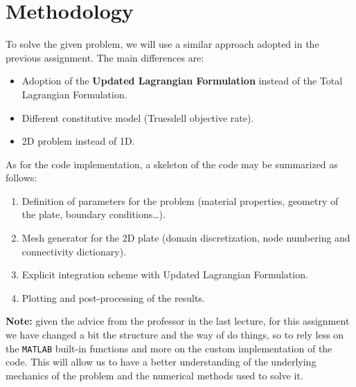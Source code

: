 \section{Methodology}
\label{sec:methodology}

To solve the given problem, we will use a similar approach adopted in the previous assignment.
The main differences are:

\begin{itemize}
    \item Adoption of the \textbf{Updated Lagrangian Formulation} instead of the Total Lagrangian Formulation.
    \item Different constitutive model (Truesdell objective rate).
    \item 2D problem instead of 1D.
\end{itemize}

As for the code implementation, a skeleton of the code may be summarized as follows:

\begin{enumerate}
    \item Definition of parameters for the problem (material properties, geometry of the plate, boundary conditions\dots).
    \item Mesh generator for the 2D plate (domain discretization, node numbering and connectivity dictionary).
    \item Explicit integration scheme with Updated Lagrangian Formulation.
    \item Plotting and post-processing of the results.
\end{enumerate}

\textbf{Note:} given the advice from the professor in the last lecture, for this assignment we have changed a bit the structure and the way of do things, so to rely less on the \texttt{MATLAB} built-in functions and more on the custom implementation of the code.
This will allow us to have a better understanding of the underlying mechanics of the problem and the numerical methods used to solve it.